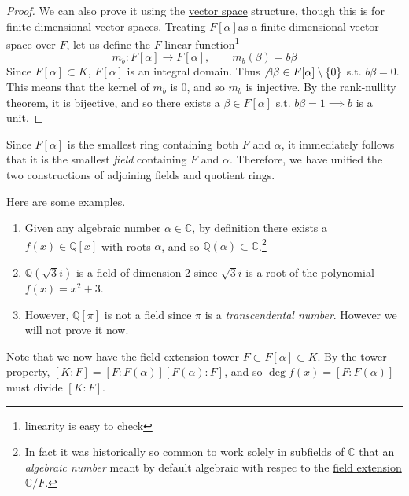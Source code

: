   \begin{proof}
    We can also prove it using the \hyperref[def:vector-space]{vector space} structure, though this is for finite-dimensional vector spaces. Treating $F[\alpha]$as a finite-dimensional vector space over $F$, let us define the $F$-linear function\footnote{linearity is easy to check}
    \begin{equation}
      m_b: F[\alpha] \rightarrow F[\alpha], \qquad m_b (\beta) = b\beta
    \end{equation} 
    Since $F[\alpha] \subset K$, $F[\alpha]$ is an integral domain. Thus $\not\exists \beta \in F[\alpha] \setminus \{0\}$ s.t. $b \beta = 0$. This means that the kernel of $m_b$ is $0$, and so $m_b$ is injective. By the rank-nullity theorem, it is bijective, and so there exists a $\beta \in F[\alpha]$ s.t. $b \beta = 1 \implies b$ is a unit. 
  \end{proof} 

  Since $F[\alpha]$ is the smallest ring containing both $F$ and $\alpha$, it immediately follows that it is the smallest \textit{field} containing $F$ and $\alpha$. Therefore, we have unified the two constructions of adjoining fields and quotient rings. 

  \begin{example}
    \label{ex:some-adjoining-fields}
    Here are some examples. 
    \begin{enumerate}
      \item Given any algebraic number $\alpha \in \mathbb{C}$, by definition there exists a $f(x) \in \mathbb{Q}[x]$ with roots $\alpha$, and so $\mathbb{Q}(\alpha) \subset \mathbb{C}$.\footnote{In fact it was historically so common to work solely in subfields of $\mathbb{C}$ that an \textit{algebraic number} meant by default algebraic with respec to the \hyperref[def:field-extension]{field extension} $\mathbb{C}/F$.}
      \item $\mathbb{Q}(\sqrt{3} i)$ is a field of dimension 2 since $\sqrt{3}i$ is a root of the polynomial $f(x) = x^2 + 3$. 
      \item However, $\mathbb{Q}[\pi]$ is not a field since $\pi$ is a \textit{transcendental number}. However we will not prove it now. 
    \end{enumerate}
  \end{example}

  Note that we now have the \hyperref[def:field-extension]{field extension} tower $F \subset F[\alpha] \subset K$. By the tower property, $[K:F] = [F:F(\alpha)] [F(\alpha):F]$, and so $\deg{f(x)} = [F:F(\alpha)]$ must divide $[K:F]$. 

